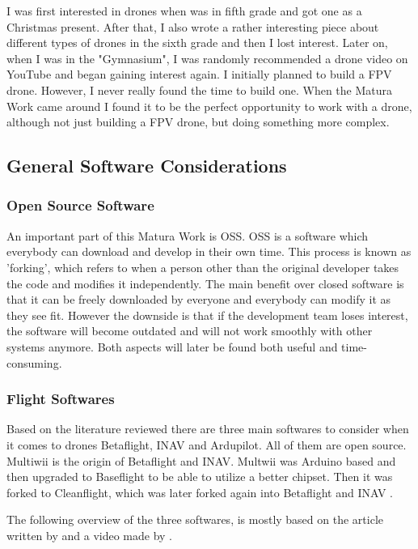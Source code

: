 \documentclass[svgnames]{article}
\begin{document}
	I was first interested in drones when was in fifth grade and got one as a Christmas present. After that, I also wrote a rather interesting piece about different types of drones in the sixth grade and then I lost interest. Later on, when I was in the "Gymnasium", I was randomly recommended a drone video on YouTube and began gaining interest again. I initially planned to build a \gls{FPV} drone. However, I never really found the time to build one. When the Matura Work came around I found it to be the perfect opportunity to work with a drone, although not just building a \gls{FPV} drone, but doing something more complex.


	
	\subsection{General Software Considerations}
	\subsubsection{Open Source Software}
	An important part of this Matura Work is \gls{OSS}. \gls{OSS} is a software which everybody can download and develop in their own time. This process is known as 'forking', which refers to when a person other than the original developer takes the code and modifies it independently. The main benefit over closed software is that it can be freely downloaded by everyone and everybody can modify it as they see fit. However the downside is that if the development team loses interest, the software will become outdated and will not work smoothly with other systems anymore. Both aspects will later be found both useful and time-consuming. 
	
	
	\subsubsection{Flight Softwares}
	Based on the literature reviewed there are three main softwares to consider when it comes to drones Betaflight, INAV and Ardupilot. All of them are open source. Multiwii is the origin of Betaflight and INAV. Multwii was Arduino based and then upgraded to Baseflight to be able to utilize a better chipset. Then it was forked to Cleanflight, which was later forked again into Betaflight and INAV \cite{history}. 
	
	The following overview of the three softwares, is mostly based on the article written by \textcite{firmwarearticle} and a video made by \textcite{firmwarevideo}.
	
\end{document}
